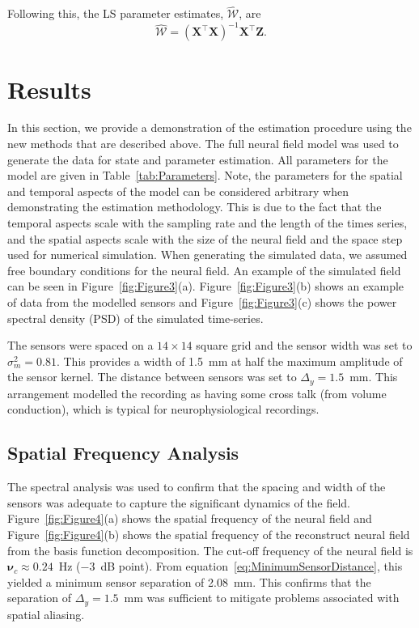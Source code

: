 \documentclass[12pt]{iopart}
\begin{document}
Following this, the LS parameter estimates, $ \hat{\mathcal{W}}$, are
\begin{equation}
	\hat{\mathcal{W}}=(\mathbf X^\top\mathbf X)^{-1}\mathbf X^\top\mathbf Z. 
\end{equation}

\section{Results}\label{ResultsSection} In this section, we provide a demonstration of the estimation procedure using the new methods that are described above. The full neural field model was used to generate the data for state and parameter estimation. All parameters for the model are given in Table~\ref{tab:Parameters}. Note, the parameters for the spatial and temporal aspects of the model can be considered arbitrary when demonstrating the estimation methodology. This is due to the fact that the temporal aspects scale with the sampling rate and the length of the times series, and the spatial aspects scale with the size of the neural field and the space step used for numerical simulation. When generating the simulated data, we assumed free boundary conditions for the neural field. An example of the simulated field can be seen in Figure~\ref{fig:Figure3}(a). Figure~\ref{fig:Figure3}(b) shows an example of data from the modelled sensors and Figure~\ref{fig:Figure3}(c) shows the power spectral density (PSD) of the simulated time-series. %

The sensors were spaced on a $14 \times 14$ square grid and the sensor width was set to $\sigma^2_m = 0.81$. This provides a width of 1.5~mm at half the maximum amplitude of the sensor kernel. The distance between sensors was set to $\Delta_y = 1.5$~mm. This arrangement modelled the recording as having some cross talk (from volume conduction), which is typical for neurophysiological recordings.

\subsection{Spatial Frequency Analysis}
The spectral analysis was used to confirm that the spacing and width of the sensors was adequate to capture the significant dynamics of the field. Figure~\ref{fig:Figure4}(a) shows the spatial frequency of the neural field and Figure~\ref{fig:Figure4}(b) shows the spatial frequency of the reconstruct neural field from the basis function decomposition. The cut-off frequency of the neural field is $\boldsymbol{\nu}_c \approx 0.24$~Hz ($-3$~dB point). From equation~\ref{eq:MinimumSensorDistance}, this yielded a minimum sensor separation of 2.08~mm. This confirms that the separation of $\Delta_{y} = 1.5$~mm was sufficient to mitigate problems associated with spatial aliasing.
\end{document}

